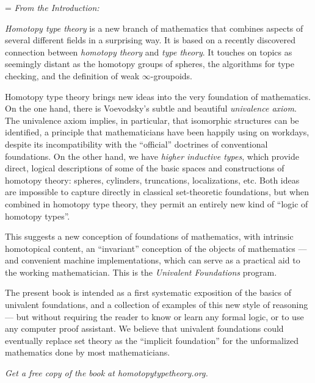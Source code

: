 
{\raggedright
\parindent=0pt
\parskip=\baselineskip
\emph{\OPTbacktitlefont From the Introduction:}
\OPTbackfont

\emph{Homotopy type theory} is a new branch of mathematics that combines aspects of several different fields in a surprising way. It is based on a recently discovered connection between \emph{homotopy theory} and \emph{type theory}.
It touches on topics as seemingly distant as the homotopy groups of spheres, the algorithms for type checking, and the definition of weak $\infty$-groupoids.

Homotopy type theory brings new ideas into the very foundation of mathematics.
On the one hand, there is Voevodsky's subtle and beautiful \emph{univalence axiom}.
The univalence axiom implies, in particular, that isomorphic structures can be identified, a principle that mathematicians have been happily using on workdays, despite its incompatibility with the ``official'' doctrines of conventional foundations.
On the other hand, we have \emph{higher inductive types}, which provide direct, logical descriptions of some of the basic spaces and constructions of homotopy theory: spheres, cylinders, truncations, localizations, etc.
Both ideas are impossible to capture directly in classical set-theoretic foundations, but when combined in homotopy type theory, they permit an entirely new kind of ``logic of homotopy types''.

This suggests a new conception of foundations of mathematics, with intrinsic homotopical content, an ``invariant'' conception of the objects of mathematics --- and convenient machine implementations, which can serve as a practical aid to the working mathematician.
This is the \emph{Univalent Foundations} program.

The present book is intended as a first systematic exposition of the basics of univalent foundations, and a collection of examples of this new style of reasoning --- but without requiring the reader to know or learn any formal logic, or to use any computer proof assistant.
We believe that univalent foundations could eventually replace set theory as the ``implicit foundation'' for the unformalized mathematics done by most mathematicians.

\bigskip

\begin{center}
  \OPTbacktitlefont
  \emph{Get a free copy of the book at homotopytypetheory.org.}
\end{center}
}
